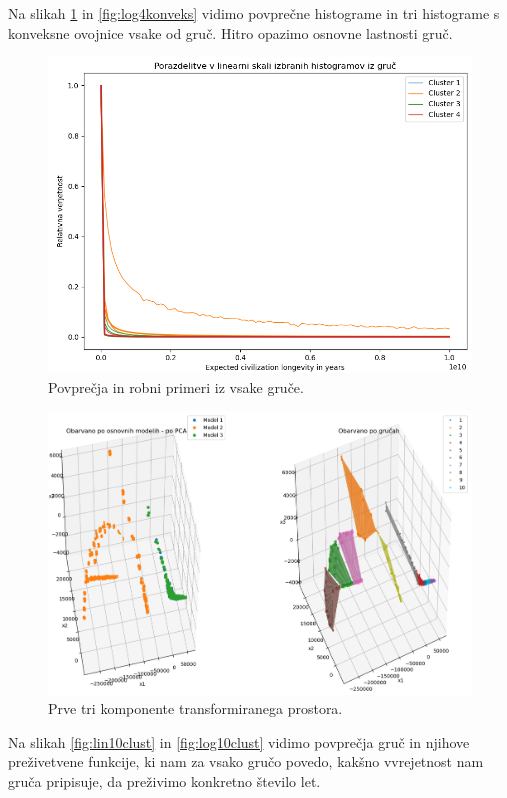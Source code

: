 \documentclass[a4paper]{IEEEtran}
\begin{document}
Na slikah \ref{fig:lin4konveks} in \ref{fig:log4konveks} vidimo povprečne histograme in tri histograme s konveksne ovojnice vsake od gruč. Hitro opazimo osnovne lastnosti gruč.

\begin{figure}
	\centering
	\includegraphics[width=0.8\linewidth]{Figures/lin4konveks}
	\caption{Povprečja in robni primeri iz vsake gruče.}
	\label{fig:lin4konveks}
\end{figure}

\begin{figure}
	\centering
	\includegraphics[width=0.9\linewidth]{Figures/lin10pca}
	\caption{Prve tri komponente transformiranega prostora.}
	\label{fig:lin10pca}
\end{figure}

Na slikah \ref{fig:lin10clust} in \ref{fig:log10clust} vidimo povprečja gruč in njihove preživetvene funkcije, ki nam za vsako gručo povedo, kakšno vvrejetnost nam gruča pripisuje, da preživimo konkretno število let.
\end{document}
